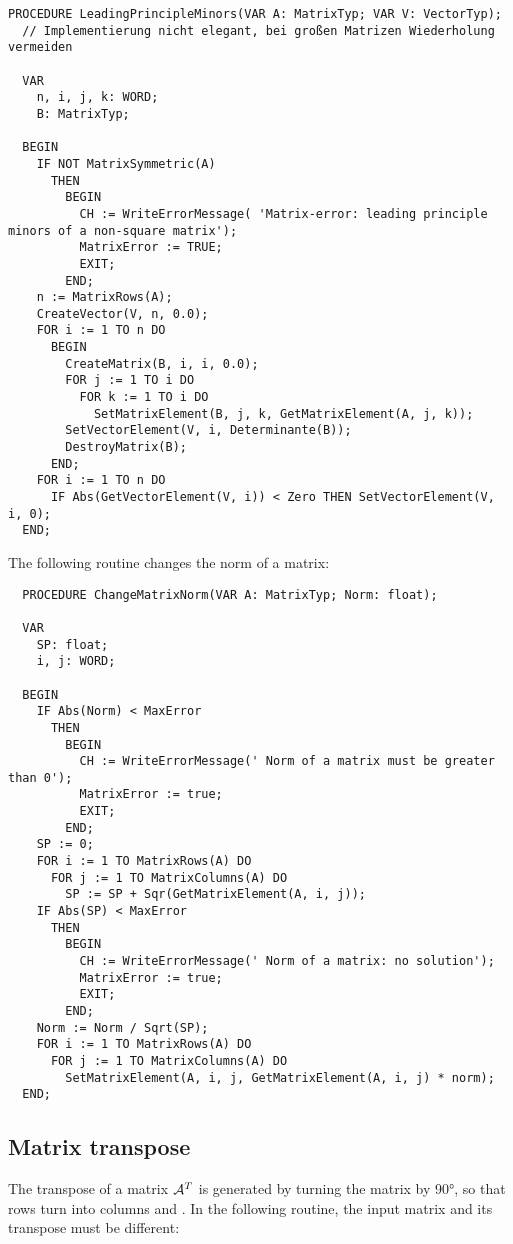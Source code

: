 \begin{refsection}
\begin{lstlisting}[caption=Leading principle minors]
  PROCEDURE LeadingPrincipleMinors(VAR A: MatrixTyp; VAR V: VectorTyp);
  // Implementierung nicht elegant, bei großen Matrizen Wiederholung vermeiden

  VAR
    n, i, j, k: WORD;
    B: MatrixTyp;

  BEGIN
    IF NOT MatrixSymmetric(A)
      THEN
        BEGIN
          CH := WriteErrorMessage( 'Matrix-error: leading principle minors of a non-square matrix');
          MatrixError := TRUE;
          EXIT;
        END;
    n := MatrixRows(A);
    CreateVector(V, n, 0.0);
    FOR i := 1 TO n DO
      BEGIN
        CreateMatrix(B, i, i, 0.0);
        FOR j := 1 TO i DO
          FOR k := 1 TO i DO
            SetMatrixElement(B, j, k, GetMatrixElement(A, j, k));
        SetVectorElement(V, i, Determinante(B));
        DestroyMatrix(B);
      END;
    FOR i := 1 TO n DO
      IF Abs(GetVectorElement(V, i)) < Zero THEN SetVectorElement(V, i, 0);
  END;
\end{lstlisting}

The following routine changes the norm of a matrix:

\begin{lstlisting}
  PROCEDURE ChangeMatrixNorm(VAR A: MatrixTyp; Norm: float);

  VAR
    SP: float;
    i, j: WORD;

  BEGIN
    IF Abs(Norm) < MaxError
      THEN
        BEGIN
          CH := WriteErrorMessage(' Norm of a matrix must be greater than 0');
          MatrixError := true;
          EXIT;
        END;
    SP := 0;
    FOR i := 1 TO MatrixRows(A) DO
      FOR j := 1 TO MatrixColumns(A) DO
        SP := SP + Sqr(GetMatrixElement(A, i, j));
    IF Abs(SP) < MaxError
      THEN
        BEGIN
          CH := WriteErrorMessage(' Norm of a matrix: no solution');
          MatrixError := true;
          EXIT;
        END;
    Norm := Norm / Sqrt(SP);
    FOR i := 1 TO MatrixRows(A) DO
      FOR j := 1 TO MatrixColumns(A) DO
        SetMatrixElement(A, i, j, GetMatrixElement(A, i, j) * norm);
  END;
\end{lstlisting}

\subsection{Matrix transpose}

The transpose of a matrix \(\mathcal{A}^T \) is generated by turning the matrix by \ang{90}, so that rows turn into columns and . In the following routine, the input matrix and its transpose must be different:


\end{refsection}
